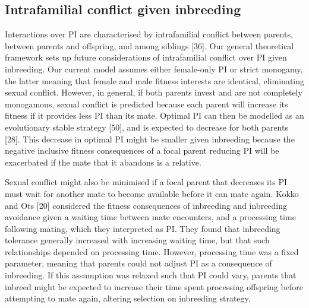 \documentclass[12pt]{article}
\begin{document}
\subsection*{Intrafamilial conflict given inbreeding}

Interactions over PI are characterised by intrafamilial conflict between parents, between parents and offspring, and among siblings [36]. Our general theoretical framework sets up future considerations of intrafamilial conflict over PI given inbreeding. Our current model assumes either female-only PI or strict monogamy, the latter meaning that female and male fitness interests are identical, eliminating sexual conflict. However, in general, if both parents invest and are not completely monogamous, sexual conflict is predicted because each parent will increase its fitness if it provides less PI than its mate. Optimal PI can then be modelled as an evolutionary stable strategy [50], and is expected to decrease for both parents [28]. This decrease in optimal PI might be smaller given inbreeding because the negative inclusive fitness consequences of a focal parent reducing PI will be exacerbated if the mate that it abandons is a relative. 

Sexual conflict might also be minimised if a focal parent that decreases its PI must wait for another mate to become available before it can mate again. Kokko and Ots [20] considered the fitness consequences of inbreeding and inbreeding avoidance given a waiting time between mate encounters, and a processing time following mating, which they interpreted as PI. They found that inbreeding tolerance generally increased with increasing waiting time, but that such relationships depended on processing time. However, processing time was a fixed parameter, meaning that parents could not adjust PI as a consequence of inbreeding. If this assumption was relaxed such that PI could vary, parents that inbreed might be expected to increase their time spent processing offspring before attempting to mate again, altering selection on inbreeding strategy.
\end{document}
